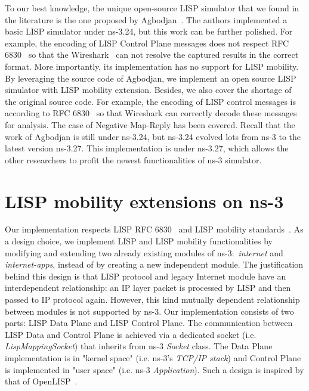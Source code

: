 To our best knowledge, the unique open-source LISP simulator that we found in the literature is the one proposed by Agbodjan~\cite{lionel2016}. The authors implemented a basic LISP simulator under ns-3.24, but this work can be further polished. For example, the encoding of LISP Control Plane messages does not respect RFC 6830~\cite{rfc6830} so that the Wireshark~\cite{wireshark} can not resolve the captured results in the correct format. %
More importantly, its implementation has no support for LISP mobility. %
By leveraging the source code of Agbodjan, we implement an open source LISP simulator with LISP mobility extension. Besides, we also cover the shortage of the original source code. For example, the encoding of LISP control messages is according to RFC 6830~\cite{rfc6830} so that Wireshark can correctly decode these messages for analysis. The case of Negative Map-Reply has been covered. Recall that the work of Agbodjan is still under ns-3.24, but ns-3.24 evolved lots from ns-3 to the latest version ns-3.27. This implementation is under ns-3.27, which allows the other researchers to profit the newest functionalities of ns-3 simulator.

 
\section{ LISP mobility extensions on ns-3}
\label{sec:ns3_lispmn}

Our implementation respects LISP RFC 6830~\cite{rfc6830} and LISP mobility standards~\cite{meyer2016lisp}. As a design choice, we implement LISP and LISP mobility functionalities by modifying and extending two already existing modules of ns-3:~\emph{internet} and \emph{internet-apps}, instead of by creating a new independent module. The justification behind this design is that LISP protocol and legacy Internet module have an interdependent relationship: an IP layer packet is processed by LISP and then passed to IP protocol again. However, this kind mutually dependent relationship between modules is not supported by ns-3. Our implementation consists of two parts: LISP Data Plane and LISP Control Plane. The communication between LISP Data and Control Plane is achieved via a dedicated socket (i.e. \emph{LispMappingSocket}) that inherits from ns-3 \emph{Socket} class. The Data Plane implementation is in "kernel space" (i.e. ns-3's \emph{TCP/IP stack}) and Control Plane is implemented in "user space" (i.e. ns-3 \emph{Application}). Such a design is inspired by that of OpenLISP~\cite{saucez2009openlisp}.  

